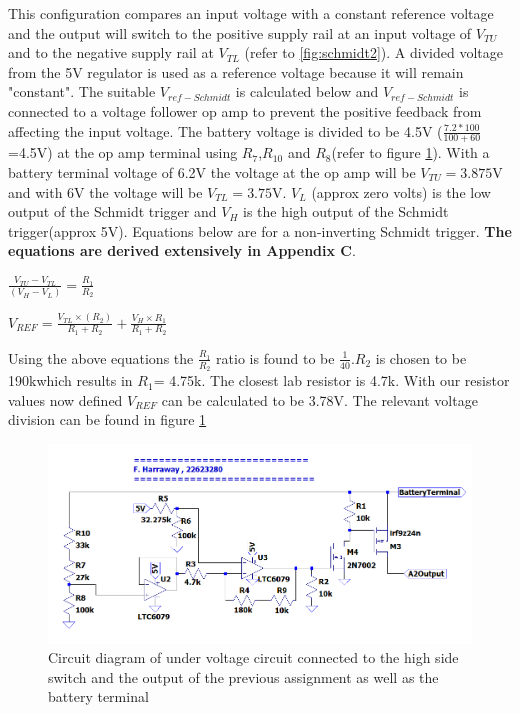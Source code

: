   This configuration compares an input voltage with a constant reference voltage and the output will switch to the positive supply rail at an input voltage of $V_{TU}$ and to the negative supply rail at $V_{TL}$ (refer to \ref{fig:schmidt2}). A divided voltage from the 5V regulator is used as a reference voltage because it will remain "constant". The suitable $V_{ref-Schmidt}$ is calculated below and $V_{ref-Schmidt}$ is connected to a voltage follower op amp to prevent the positive feedback from affecting the input voltage. The battery voltage is divided to be 4.5V ($\frac{7.2*100}{100+60}$=4.5V) at the op amp terminal using $R_7$,$R_{10}$ and $R_8$(refer to figure \ref{fig:under}). With a battery terminal voltage of 6.2V the voltage at the op amp will be $V_{TU}=3.875$V and with 6V the voltage will be $V_{TL}=3.75$V. $V_L$ (approx zero volts) is the low output of the Schmidt trigger and $V_H$ is the high output of the Schmidt trigger(approx 5V). Equations below are for a non-inverting Schmidt trigger. \textbf{The equations are derived extensively in Appendix C}.



\begin{center}
	$\frac{V_{TU}-V_{TL}}{(V_{H}-V_L)}=\frac{R_1}{R_2}$  
\end{center}

\begin{center}
	
$	V_{REF}=\frac{V_{TL}\times (R_2)}{R_1+R_2}+\frac{V_{H}\times R_1}{R_1+R_2}$
\end{center}




Using the above equations the $\frac{R_1}{R_2}$ ratio is found to be $\frac{1}{40}$.$R_2$ is chosen to be 190k\textohm which results in $R_1$= 4.75k\textohm. The closest lab resistor is 4.7k\textohm. With our resistor values now defined $V_{REF}$ can be calculated to be 3.78V. The relevant voltage division can be found in figure \ref{fig:under}



\begin{figure}[!htb]
\centering
\includegraphics[scale=0.5]{./Figures/undervoltage}
\caption{Circuit diagram of under voltage circuit connected to the high side switch and the output of the previous assignment as well as the battery terminal}
\label{fig:under}
\end{figure}



